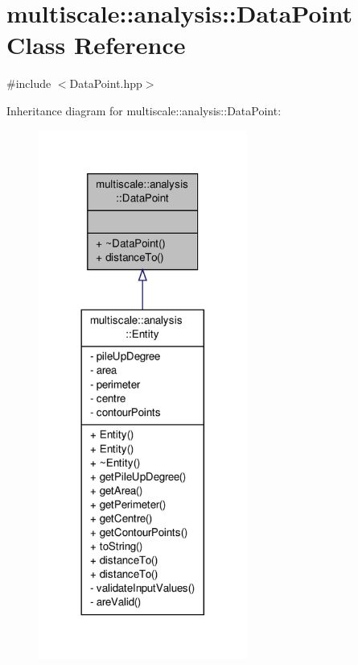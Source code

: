 \hypertarget{classmultiscale_1_1analysis_1_1DataPoint}{\section{multiscale\-:\-:analysis\-:\-:Data\-Point Class Reference}
\label{classmultiscale_1_1analysis_1_1DataPoint}
}


{\ttfamily \#include $<$Data\-Point.\-hpp$>$}



Inheritance diagram for multiscale\-:\-:analysis\-:\-:Data\-Point\-:\nopagebreak
\begin{figure}[H]
\begin{center}
\leavevmode
\includegraphics[width=194pt]{classmultiscale_1_1analysis_1_1DataPoint__inherit__graph}
\end{center}
\end{figure}


